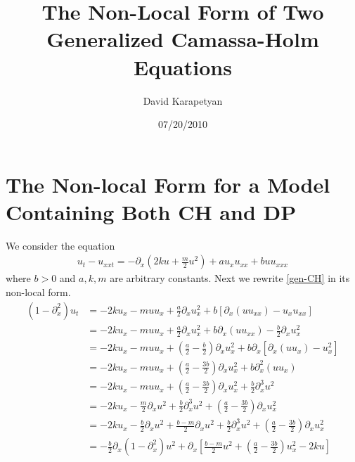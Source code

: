 \documentclass[12pt,reqno]{amsart}
\numberwithin{equation}{section}  %
\numberwithin{figure}{section}
\newcommand{\p}{\partial}
\theoremstyle{plain}
\theoremstyle{definition}
\theoremstyle{remark}
\begin{document}
\title{The Non-Local Form of Two Generalized Camassa-Holm Equations }
\author{David Karapetyan}
\address{Department of Mathematics  \\
         University  of Notre Dame\\
				          Notre Dame, IN 46556 }
									\date{07/20/2010}
									\maketitle
									\section{The Non-local Form for a Model Containing Both CH and
									DP}
We consider the equation
%
%
\begin{equation}
	\label{gen-CH}
	\begin{split}
		u_{t} - u_{xxt} = -\p_x(2ku + \frac{m}{2}u^{2}) + a u_{x}u_{xx} +
		buu_{xxx}
	\end{split}
\end{equation}
%
%
where $b>0$ and $a, k, m$ are arbitrary constants. Next we rewrite
\eqref{gen-CH} in its non-local form.
%
%
\begin{equation*}
	\begin{split}
		(1-\p_x^2)u_{t}
		& = -2k u_{x} - muu_{x} + \frac{a}{2}\p_x u_{x}^2 + b \left[
		\p_x(uu_{xx}) - u_xu_{xx} \right]
		\\
		& = - 2ku_{x} - muu_{x} + \frac{a}{2}\p_x u_{x}^2 + b \p_x(u u_{xx}) -
		\frac{b}{2}\p_x u_{x}^2
		\\
		& = - 2ku_{x} - mu u_{x} + \left( \frac{a}{2} - \frac{b}{2} \right)\p_x
		u_x^2 + b \p_x \left[ \p_x(u u_{x}) - u_{x}^2 \right]
		\\
		& = -2k u_x - mu u_{x} + \left( \frac{a}{2} - \frac{3b}{2} \right)\p_x
		u_{x}^2 + b \p_x^2(u u_{x})
		\\
		& = -2ku_{x} - muu_{x} + \left( \frac{a}{2} - \frac{3b}{2} \right) \p_x
		u_{x}^2 + \frac{b}{2}\p_x^{3}u^{2}
		\\
		& = -2ku_{x} - \frac{m}{2} \p_x u^{2} + \frac{b}{2}\p_x^3 u^{2} + \left(
		\frac{a}{2} - \frac{3b}{2} \right)\p_x u_x^2
		\\
		& = -2k u_{x} - \frac{b}{2}\p_x u^2 + \frac{b-m}{2} \p_x u^{2} +
		\frac{b}{2} \p_x^3 u^2 + \left( \frac{a}{2} - \frac{3b}{2} \right)\p_x
		u_{x}^2
		\\
		& = -\frac{b}{2} \p_x (1-\p_x^2)u^{2} + \p_x \left[ \frac{b-m}{2}u^{2} +
		\left( \frac{a}{2} - \frac{3b}{2} \right )u_{x}^2 - 2ku \right]
	\end{split}
\end{equation*}
\end{document}
